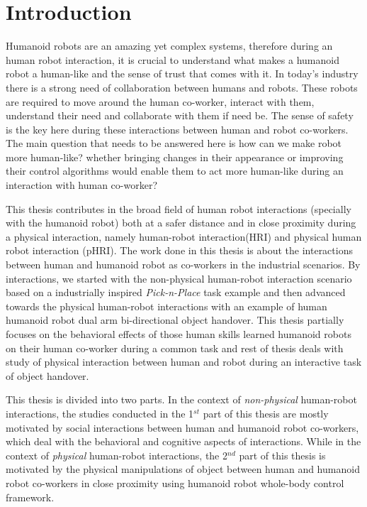 
{\color{blue}\chapter*{Introduction}}

Humanoid robots are an amazing yet complex systems, therefore during an human robot interaction, it is crucial to understand what makes a humanoid robot a human-like and the sense of trust that comes with it. In today's industry there is a strong need of collaboration between humans and robots. These robots are required to move around the human co-worker, interact with them, understand their need and collaborate with them if need be. The sense of safety is the key here during these interactions between human and robot co-workers. The main question that needs to be answered here is how can we make robot more human-like? whether bringing changes in their appearance or improving their control algorithms would enable them to act more human-like during an interaction with human co-worker?

This thesis contributes in the broad field of human robot interactions (specially with the humanoid robot) both at a safer distance and in close proximity during a physical interaction, namely human-robot interaction(HRI) and physical human robot interaction (pHRI). The work done in this thesis is about the interactions between human and humanoid robot as co-workers in the industrial scenarios. By interactions, we started with the non-physical human-robot interaction scenario based on a industrially inspired \textit{Pick-n-Place} task example and then advanced towards the physical human-robot interactions with an example of human humanoid robot dual arm bi-directional object handover. This thesis partially focuses on the behavioral effects of those human skills learned humanoid robots on their human co-worker during a common task and rest of thesis deals with study of physical interaction between human and robot during an interactive task of object handover.

This thesis is divided into two parts. In the context of \textit{non-physical} human-robot interactions, the studies conducted in the 1$^{st}$ part of this thesis are mostly motivated by social interactions between human and humanoid robot co-workers, which deal with the behavioral and cognitive aspects of interactions. While in the context of \textit{physical} human-robot interactions, the 2$^{nd}$ part of this thesis is motivated by the physical manipulations of object between human and humanoid robot co-workers in close proximity using humanoid robot whole-body control framework.


